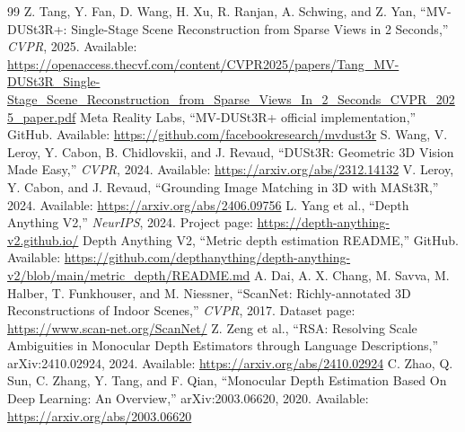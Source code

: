 \documentclass[12pt,a4paper]{article}
\begin{document}
\newpage
\begin{thebibliography}{99}
 Z. Tang, Y. Fan, D. Wang, H. Xu, R. Ranjan, A. Schwing, and Z. Yan, ``MV-DUSt3R+: Single-Stage Scene Reconstruction from Sparse Views in 2 Seconds,'' \textit{CVPR}, 2025. Available: \url{https://openaccess.thecvf.com/content/CVPR2025/papers/Tang_MV-DUSt3R_Single-Stage_Scene_Reconstruction_from_Sparse_Views_In_2_Seconds_CVPR_2025_paper.pdf}
 Meta Reality Labs, ``MV-DUSt3R+ official implementation,'' GitHub. Available: \url{https://github.com/facebookresearch/mvdust3r}
 S. Wang, V. Leroy, Y. Cabon, B. Chidlovskii, and J. Revaud, ``DUSt3R: Geometric 3D Vision Made Easy,'' \textit{CVPR}, 2024. Available: \url{https://arxiv.org/abs/2312.14132}
 V. Leroy, Y. Cabon, and J. Revaud, ``Grounding Image Matching in 3D with MASt3R,'' 2024. Available: \url{https://arxiv.org/abs/2406.09756}
 L. Yang et al., ``Depth Anything V2,'' \textit{NeurIPS}, 2024. Project page: \url{https://depth-anything-v2.github.io/}
 Depth Anything V2, ``Metric depth estimation README,'' GitHub. Available: \url{https://github.com/depthanything/depth-anything-v2/blob/main/metric_depth/README.md}
 A. Dai, A. X. Chang, M. Savva, M. Halber, T. Funkhouser, and M. Niessner, ``ScanNet: Richly-annotated 3D Reconstructions of Indoor Scenes,'' \textit{CVPR}, 2017. Dataset page: \url{https://www.scan-net.org/ScanNet/}
 Z. Zeng et al., ``RSA: Resolving Scale Ambiguities in Monocular Depth Estimators through Language Descriptions,'' arXiv:2410.02924, 2024. Available: \url{https://arxiv.org/abs/2410.02924}
 C. Zhao, Q. Sun, C. Zhang, Y. Tang, and F. Qian, ``Monocular Depth Estimation Based On Deep Learning: An Overview,'' arXiv:2003.06620, 2020. Available: \url{https://arxiv.org/abs/2003.06620}
\end{thebibliography}
\end{document}
